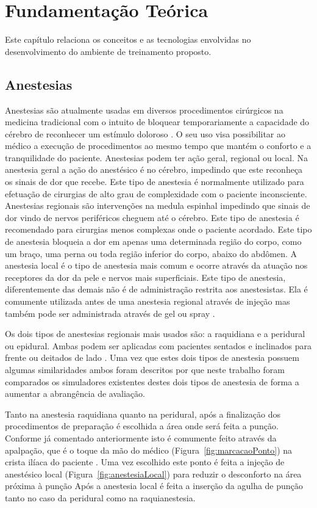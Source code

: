 \chapter{Fundamentação Teórica} \label{cap:cap2}

Este capítulo relaciona os conceitos e as tecnologias envolvidas no desenvolvimento do ambiente de treinamento proposto. 

\section{Anestesias}

Anestesias são atualmente usadas em diversos procedimentos cirúrgicos na medicina tradicional com o intuito de bloquear temporariamente a capacidade do cérebro de reconhecer um estímulo doloroso \cite{Raj1988}. O seu uso visa possibilitar ao médico a execução de procedimentos ao mesmo tempo que mantém o conforto e a tranquilidade do paciente. Anestesias podem ter ação geral, regional ou local. Na anestesia geral a ação do anestésico é no cérebro, impedindo que este reconheça os sinais de dor que recebe. Este tipo de anestesia é normalmente utilizado para efetuação de cirurgias de alto grau de complexidade com o paciente inconsciente. Anestesias regionais são intervenções na medula espinhal impedindo que sinais de dor vindo de nervos periféricos cheguem até o cérebro. Este tipo de anestesia é recomendado para cirurgias menos complexas onde o paciente acordado. Este tipo de anestesia bloqueia a dor em apenas uma determinada região do corpo, como um braço, uma perna ou toda região inferior do corpo, abaixo do abdômen. A anestesia local é o tipo de anestesia mais comum e ocorre através da atuação nos receptores da dor da pele e nervos mais superficiais. Este tipo de anestesia, diferentemente das demais não é de administração restrita aos anestesistas. Ela é comumente utilizada antes de uma anestesia regional através de injeção mas também pode ser administrada através de gel ou spray \cite{Miller2009}.

Os dois tipos de anestesias regionais mais usados são: a raquidiana e a peridural ou epidural. Ambas podem ser aplicadas com pacientes sentados e inclinados para frente ou deitados de lado \cite{Raj1988}. Uma vez que estes dois tipos de anestesia possuem algumas similaridades ambos foram descritos por que neste trabalho foram comparados os simuladores existentes destes dois tipos de anestesia de forma a aumentar a abrangência de avaliação.  

Tanto na anestesia raquidiana quanto na peridural, após a finalização dos procedimentos de preparação é escolhida a área onde será feita a punção. Conforme já comentado anteriormente isto é comumente feito através da apalpação, que é o toque da mão do médico (Figura~\ref{fig:marcacaoPonto}) na crista ilíaca do paciente \cite{Helayel2010,Isaacs2015}. Uma vez escolhido este ponto é feita a injeção de anestésico local (Figura~\ref{fig:anestesiaLocal}) para reduzir o desconforto na área próxima à punção \cite{Miller2009} Após a anestesia local é feita a inserção da agulha de punção tanto no caso da peridural como na raquianestesia.

